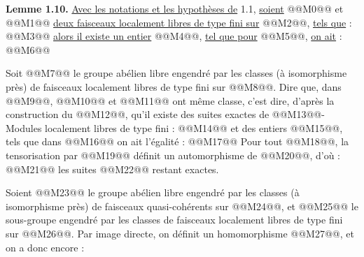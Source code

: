 
\textbf{Lemme 1.10.} \uline{Avec les notations et les hypothèses de} 1.1, \uline{soient} @@M0@@ et @@M1@@ \uline{deux faisceaux localement libres de type fini sur} @@M2@@, \uline{tels que} :
@@M3@@
\uline{alors il existe un entier} @@M4@@, \uline{tel que pour} @@M5@@, \uline{on ait} :
@@M6@@

Soit @@M7@@ le groupe abélien libre engendré par les classes (à isomorphisme près) de faisceaux localement libres de type fini sur @@M8@@. Dire que, dans @@M9@@, @@M10@@ et @@M11@@ ont même classe, c'est dire, d'après la construction du @@M12@@, qu'il existe des suites exactes de @@M13@@-Modules localement libres de type fini :
@@M14@@
et des entiers @@M15@@, tels que dans @@M16@@ on ait l'égalité :
@@M17@@
Pour tout @@M18@@, la tensorisation par @@M19@@ définit un automorphisme de @@M20@@, d'où :
@@M21@@
les suites @@M22@@ restant exactes.

Soient @@M23@@ le groupe abélien libre engendré par les classes (à isomorphisme près) de faisceaux quasi-cohérents sur @@M24@@, et @@M25@@ le sous-groupe engendré par les classes de faisceaux localement libres de type fini sur @@M26@@. Par image directe, on définit un homomorphisme @@M27@@, et on a donc encore :
